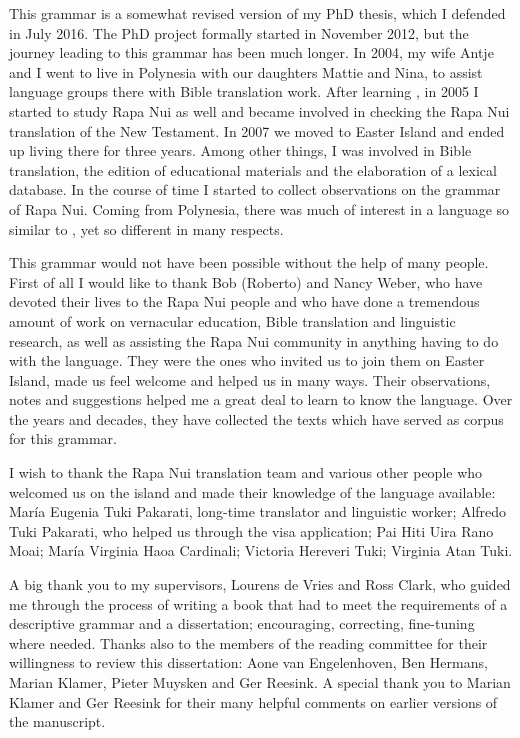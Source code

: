  
This grammar is a somewhat revised version of my PhD thesis, which I defended in July 2016. The PhD project formally started in November 2012, but the journey leading to this grammar has been much longer. In 2004, my wife Antje and I went to live in  Polynesia with our daughters Mattie and Nina, to assist language groups there with Bible translation work. After learning , in 2005 I started to study Rapa Nui as well and became involved in checking the Rapa Nui translation of the New Testament. In 2007 we moved to Easter Island and ended up living there for three years. Among other things, I was involved in Bible translation, the edition of educational materials and the elaboration of a lexical database. In the course of time I started to collect observations on the grammar of Rapa Nui. Coming from  Polynesia, there was much of interest in a language so similar to , yet so different in many respects. 

This grammar would not have been possible without the help of many people. First of all I would like to thank Bob (Roberto) and Nancy Weber, who have devoted their lives to the Rapa Nui people and who have done a tremendous amount of work on vernacular education, Bible translation and linguistic research, as well as assisting the Rapa Nui community in anything having to do with the language. They were the ones who invited us to join them on Easter Island, made us feel welcome and helped us in many ways. Their observations, notes and suggestions helped me a great deal to learn to know the language. Over the years and decades, they have collected the texts which have served as corpus for this grammar.

I wish to thank the Rapa Nui translation team and various other people who welcomed us on the island and made their knowledge of the language available: María Eugenia Tuki Pakarati, long-time translator and linguistic worker; Alfredo Tuki Pakarati, who helped us through the visa application; Pai Hiti {\ꞌ}Uira Rano Moai; María Virginia Haoa Cardinali; Victoria Hereveri Tuki; Virginia Atan Tuki.

A big thank you to my supervisors, Lourens de Vries and Ross Clark, who guided me through the process of writing a book that had to meet the requirements of a descriptive grammar and a dissertation; encouraging, correcting, fine-tuning where needed. Thanks also to the members of the reading committee for their willingness to review this dissertation: Aone van Engelenhoven, Ben Hermans, Marian Klamer, Pieter Muysken and Ger Reesink. A special thank you to Marian Klamer and Ger Reesink for their many helpful comments on earlier versions of the manuscript.

